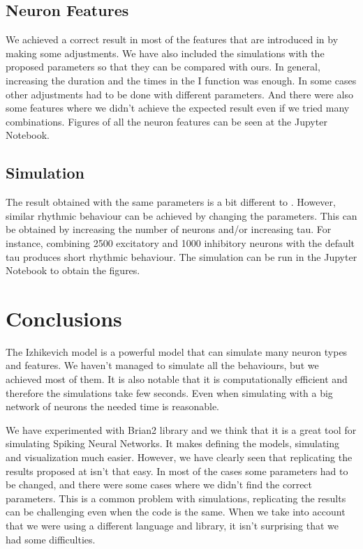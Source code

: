 \documentclass{article} %
\begin{document}
\subsection{Neuron Features}
We achieved a correct result in most of the features that are introduced in \cite{Izhikevich2004Which} by making some adjustments. We have also included the simulations with the proposed parameters so that they can be compared with ours. In general, increasing the duration and the times in the I function was enough. In some cases other adjustments had to be done with different parameters. And there were also some features where we didn't achieve the expected result even if we tried many combinations. Figures of all the neuron features can be seen at the Jupyter Notebook.

\subsection{Simulation}
The result obtained with the same parameters is a bit different to \cite{Izhikevich2003Simple}. However, similar rhythmic behaviour can be achieved by changing the parameters. This can be obtained by increasing the number of neurons and/or increasing tau. For instance, combining 2500 excitatory and 1000 inhibitory neurons with the default tau produces short rhythmic behaviour. The simulation can be run in the Jupyter Notebook to obtain the figures.

\section{Conclusions}
The Izhikevich model is a powerful model that can simulate many neuron types and features. We haven't managed to simulate all the behaviours, but we achieved most of them. It is also notable that it is computationally efficient and therefore the simulations take few seconds. Even when simulating with a big network of neurons the needed time is reasonable.

We have experimented with Brian2 library and we think that it is a great tool for simulating Spiking Neural Networks. It makes defining the models, simulating and visualization much easier. However, we have clearly seen that replicating the results proposed at \cite{Izhikevich2003Simple} \cite{Izhikevich2004Which} isn't that easy. In most of the cases some parameters had to be changed, and there were some cases where we didn't find the correct parameters. This is a common problem with simulations, replicating the results can be challenging even when the code is the same. When we take into account that we were using a different language and library, it isn't surprising that we had some difficulties.



\end{document}
